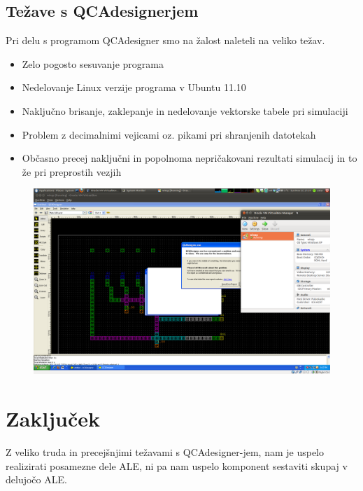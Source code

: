 \documentclass[seminar, slovene]{FRIreport}
\begin{document}
\pagebreak
\subsection{Težave s QCAdesignerjem}
Pri delu s programom QCAdesigner smo na žalost naleteli na veliko težav.
\begin{itemize}
\item Zelo pogosto sesuvanje programa
\item Nedelovanje Linux verzije programa v Ubuntu 11.10
\item Naključno brisanje, zaklepanje in nedelovanje vektorske tabele pri simulaciji
\item Problem z decimalnimi vejicami oz. pikami pri shranjenih datotekah
\item Občasno precej naključni in popolnoma nepričakovani rezultati simulacij in to že pri preprostih vezjih
\end{itemize}

\begin{figure}[H]
\begin{center}
\includegraphics[width=14cm]{qca/img/screenshot}
\end{center}
\end{figure}

%
\section{Zaključek}
Z veliko truda in precejšnjimi težavami s QCAdesigner-jem, nam je uspelo realizirati posamezne dele ALE, ni pa nam uspelo komponent sestaviti skupaj v delujočo ALE.

%
\References


\end{document}
